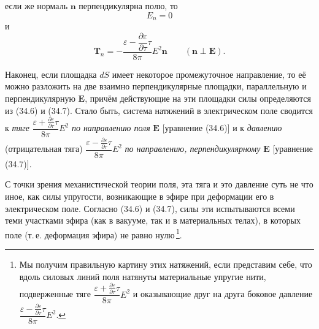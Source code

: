 \documentclass[a4paper,10pt]{article}
\begin{document}
если же нормаль $\mathbf{n}$ перпендикулярна полю, то
$$
    E_n = 0
$$
и
\begin{equation}
    \mathbf{T}_n = -\frac{\varepsilon - \dfrac{\partial\varepsilon}{\partial\tau}\tau}{8\pi}
                   E^2\mathbf{n}
    \qquad (\mathbf{n} \perp \mathbf{E}).
    \tag{34.7}
\end{equation}

Наконец, если площадка $dS$ имеет некоторое промежуточное направление,
то её можно разложить на две взаимно перпендикулярные площадки,
параллельную и перпендикулярную $\mathbf{E}$, причём действующие на
эти площадки силы определяются из (34.6) и (34.7). Стало быть, система
натяжений в электрическом поле сводится к \textit{тяге}
$\dfrac{\varepsilon + \frac{\partial\varepsilon}{\partial\tau}\tau}{8\pi}E^2$
\textit{по направлению поля} $\mathbf{E}$ [уравнение (34.6)] и к
\textit{давлению} (отрицательная тяга)
$\dfrac{\varepsilon - \frac{\partial\varepsilon}{\partial\tau}\tau}{8\pi}E^2$
\textit{по направлению, перпендикулярному} $\mathbf{E}$ [уравнение (34.7)].

С точки зрения механистической теории поля, эта тяга и это давление
суть не что иное, как силы упругости, возникающие в эфире при
деформации его в электрическом поле. Согласно (34.6) и (34.7), силы
эти испытываются всеми теми участками эфира (как в вакууме, так и
в материальных телах), в которых поле (т.\,е. деформация эфира) не
равно нулю\,\footnote{Мы получим правильную картину этих натяжений,
если представим себе, что вдоль силовых линий поля натянуты
материальные упругие нити, подверженные тяге
$\dfrac{\varepsilon + \frac{\partial\varepsilon}{\partial\tau}\tau}{8\pi}E^2$
и оказывающие друг на друга боковое давление
$\dfrac{\varepsilon - \frac{\partial\varepsilon}{\partial\tau}\tau}{8\pi}E^2$.}.

\end{document}
